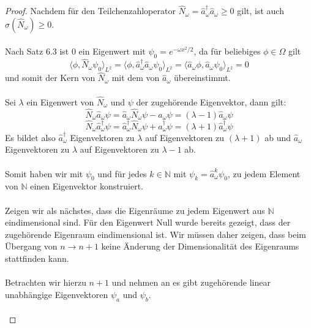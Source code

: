 \documentclass[11pt,a4paper,leqno]{report}
\numberwithin{equation}{chapter}
\begin{document}
\begin{proof}
	Nachdem f\"ur den Teilchenzahloperator $\hat{N}_\omega =\hat{a}^\dagger_\omega\hat{a}_\omega\geq 0$ gilt, ist auch $\sigma(\hat{N}_\omega)\geq 0$.\\
	\\
	Nach Satz 6.3 ist $0$ ein Eigenwert mit $\psi_0=e^{-\omega x^2 / 2}$, da f\"ur beliebiges $\phi\in \Omega$ gilt
	\begin{equation*}
		\langle \phi, \hat{N}_\omega\psi_0\rangle_{L^2}=\langle \phi, \hat{a}^\dagger_\omega\hat{a}_\omega\psi_0\rangle_{L^2}=\langle \hat{a}_\omega\phi, \hat{a}_\omega\psi_0\rangle_{L^2}=0
	\end{equation*}
und somit der Kern von $\hat{N}_\omega$ mit dem von $\hat{a}_\omega$ \"ubereinstimmt.\\
\\
Sei $\lambda$ ein Eigenwert von $\hat{N}_\omega$ und $\psi$ der zugeh\"orende Eigenvektor, dann gilt:
\begin{equation*}
	\hat{N}_\omega\hat{a}_\omega\psi=\hat{a}_\omega\hat{N}_\omega\psi-\hat{a}_\omega\psi=(\lambda -1)\hat{a}_\omega\psi
\end{equation*}
\begin{equation*}
	\hat{N}_\omega\hat{a}_\omega^\dagger\psi=\hat{a}_\omega^\dagger\hat{N}_\omega\psi+\hat{a}_\omega^\dagger\psi=(\lambda +1)\hat{a}_\omega^\dagger\psi
\end{equation*}
Es bildet also $\hat{a}_\omega^\dagger$ Eigenvektoren zu $\lambda$ auf Eigenvektoren zu $(\lambda + 1)$ ab und $\hat{a}_\omega$ Eigenvektoren zu $\lambda $ auf Eigenvektoren zu $\lambda -1$ ab.\\
\\
Somit haben wir mit $\psi_0$ und f\"ur jedes $k\in\mathbb{N}$ mit $\psi_k= \hat{a}_\omega^k\psi_0$, zu jedem Element von $\mathbb{N}$ einen Eigenvektor konstruiert.\\
\\
Zeigen wir als n\"achstes, dass die Eigenr\"aume zu jedem Eigenwert aus $\mathbb{N}$ eindimensional sind.
F\"ur den Eigenwert Null wurde bereits gezeigt, dass der zugeh\"orende Eigenraum eindimensional ist. Wir m\"ussen daher zeigen, dass beim \"Ubergang von $n\rightarrow n+1$ keine \"Anderung der Dimensionalit\"at des Eigenraums stattfinden kann.\\
\\
Betrachten wir hierzu $n+1$ und nehmen an es gibt  zugeh\"orende linear unabh\"angige Eigenvektoren $\psi_a$ und $\psi_b$.\\
\\

\end{proof}
\end{document}
